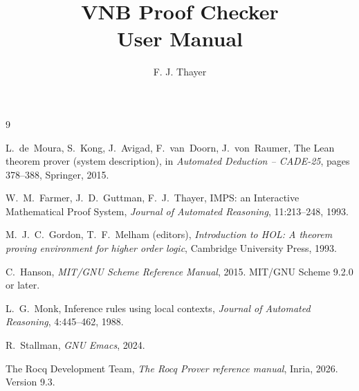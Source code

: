 \documentclass{amsbook}[openany]
\title{\textbf{VNB Proof Checker}\\[4pt]
       \large User Manual}
\author{F. J. Thayer}
\date{}
\theoremstyle{definition}
\theoremstyle{remark}
\theoremstyle{remark}
\renewcommand{\[}{\par\smallskip\begin{lrbox}{\VNBdispbox}$\displaystyle}
\renewcommand{\]}{$\end{lrbox}%
    \noindent
    \ifdim\wd\VNBdispbox>\linewidth
      \resizebox{\linewidth}{!}{\usebox{\VNBdispbox}}%
    \else
      \hbox to \linewidth{\hfil\usebox{\VNBdispbox}\hfil}%
    \fi
    \par\smallskip}
\begin{document}
\maketitle
\tableofcontents
\newpage















\appendix







\begin{thebibliography}{9}

L.~de~Moura, S.~Kong, J.~Avigad, F.~van~Doorn, J.~von~Raumer,
The Lean theorem prover (system description),
in \textit{Automated Deduction -- CADE-25}, pages 378--388, Springer, 2015.

W.~M.~Farmer, J.~D.~Guttman, F.~J.~Thayer,
IMPS: an Interactive Mathematical Proof System,
\textit{Journal of Automated Reasoning}, 11:213--248, 1993.

M.~J.~C.~Gordon, T.~F.~Melham (editors),
\textit{Introduction to HOL: A theorem proving environment for higher order logic},
Cambridge University Press, 1993.

C.~Hanson,
\textit{MIT/GNU Scheme Reference Manual}, 2015.  MIT/GNU Scheme 9.2.0 or later.

L.~G.~Monk,
Inference rules using local contexts,
\textit{Journal of Automated Reasoning}, 4:445--462, 1988.

R.~Stallman,
\textit{GNU Emacs}, 2024.

The Rocq Development Team,
\textit{The Rocq Prover reference manual}, Inria, 2026.  Version 9.3.
\end{thebibliography}
\end{document}
